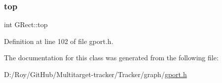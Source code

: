 \subsubsection{\texorpdfstring{top}{top}}
{\footnotesize\ttfamily int G\+Rect\+::top\hspace{0.3cm}{\ttfamily [protected]}}



Definition at line 102 of file gport.\+h.



The documentation for this class was generated from the following file\+:\begin{DoxyCompactItemize}
\item 
D\+:/\+Roy/\+Git\+Hub/\+Multitarget-\/tracker/\+Tracker/graph/\mbox{\hyperlink{gport_8h}{gport.\+h}}\end{DoxyCompactItemize}
